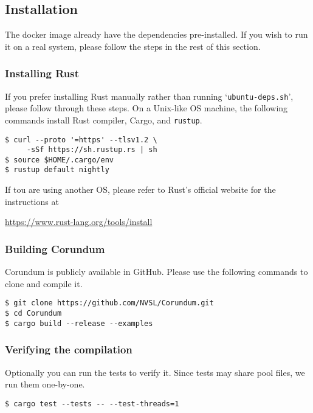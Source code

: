 {\subsection{Installation}

The docker image already have the dependencies pre-installed. If you wish to run it on a real system, please follow the steps in the rest of this section.

\subsubsection{Installing Rust}

If you prefer installing Rust manually rather than running `\verb+ubuntu-deps.sh+', please follow through these steps.
On a Unix-like OS machine, the following commands
install Rust compiler, Cargo, and \verb+rustup+. 

\begin{verbatim}
$ curl --proto '=https' --tlsv1.2 \
     -sSf https://sh.rustup.rs | sh
$ source $HOME/.cargo/env
$ rustup default nightly
\end{verbatim}

If tou are using
another OS, please refer to Rust's official website
for the instructions at
\begin{center}
  \href{https://www.rust-lang.org/tools/install}{https://www.rust-lang.org/tools/install}
\end{center}

\subsubsection{Building Corundum}

Corundum is publicly available in GitHub. Please use
the following commands to clone and compile it.

\begin{verbatim}
$ git clone https://github.com/NVSL/Corundum.git
$ cd Corundum
$ cargo build --release --examples
\end{verbatim}

\subsubsection{Verifying the compilation}

Optionally you can run the tests to verify it.
Since tests may share pool files, we run them one-by-one.

\begin{verbatim}
$ cargo test --tests -- --test-threads=1 
\end{verbatim}

}
